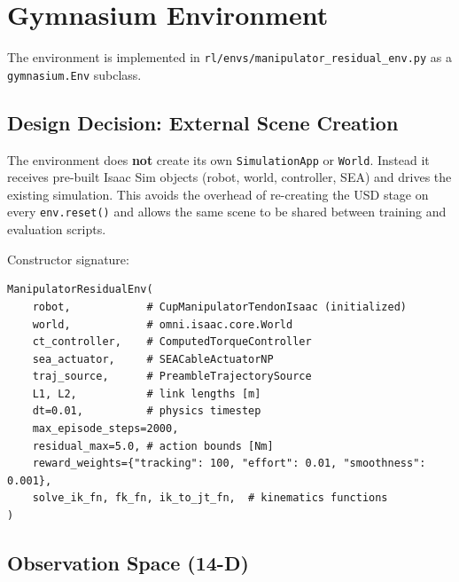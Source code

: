 \documentclass[11pt, a4paper]{article}
\begin{document}
\section{Gymnasium Environment}
\label{sec:env}

The environment is implemented in
\texttt{rl/envs/manipulator\_residual\_env.py} as a
\texttt{gymnasium.Env} subclass.

\subsection{Design Decision: External Scene Creation}

\begin{mdframed}
The environment does \textbf{not} create its own \texttt{SimulationApp} or
\texttt{World}.  Instead it receives pre-built Isaac Sim objects (robot,
world, controller, SEA) and drives the existing simulation.  This avoids
the overhead of re-creating the USD stage on every \texttt{env.reset()} and
allows the same scene to be shared between training and evaluation scripts.
\end{mdframed}

Constructor signature:
\begin{lstlisting}
ManipulatorResidualEnv(
    robot,            # CupManipulatorTendonIsaac (initialized)
    world,            # omni.isaac.core.World
    ct_controller,    # ComputedTorqueController
    sea_actuator,     # SEACableActuatorNP
    traj_source,      # PreambleTrajectorySource
    L1, L2,           # link lengths [m]
    dt=0.01,          # physics timestep
    max_episode_steps=2000,
    residual_max=5.0, # action bounds [Nm]
    reward_weights={"tracking": 100, "effort": 0.01, "smoothness": 0.001},
    solve_ik_fn, fk_fn, ik_to_jt_fn,  # kinematics functions
)
\end{lstlisting}

\subsection{Observation Space (14-D)}
\end{document}
